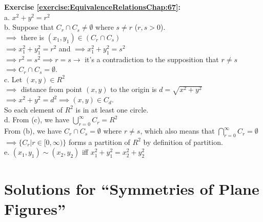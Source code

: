 \textbf{Exercise \ref{exercise:EquivalenceRelationsChap:67}:}\\
a. $x^2+y^2=r^2$\\
b. Suppose that $C_r\cap C_s \neq \emptyset$ where $s\neq r$ ($r,s>0$).\\
$\implies$  there is $(x_1,y_1)\in (C_r\cap C_s)$\\
$\implies x_1^2+y_1^2=r^2$ and $\implies x_1^2+y_1^2=s^2$\\
$\implies r^2=s^2 \implies r=s \to$ it's a contradiction to the supposition that $r\neq s$\\
$\implies C_r\cap C_s=\emptyset$.\\
c. Let $(x,y)\in R^2$\\
$\implies$  distance from point $(x,y)$ to the origin is $d=\sqrt{x^2+y^2}$\\
$\implies x^2+y^2=d^2 \implies (x,y)\in C_d$.\\
So each element of $R^2$ is in at least one circle.\\
d. From (c), we have $\bigcup_{r=0}^{\infty}C_r=R^2$\\
From (b), we have $C_r\cap C_s=\emptyset$ where $r\neq s$, which also means that $\bigcap_{r=0}^{\infty}C_r=\emptyset$\\
$\implies \{C_r|r\in [0,\infty)\}$ forms a partition of $R^2$ by definition of partition.\\
e. $(x_1,y_1)\sim (x_2,y_2)$ iff $x_1^2+y_1^2=x_2^2+y_2^2$\\


\section{Solutions for  ``Symmetries of Plane Figures''}
\noindent{}\bigskip

